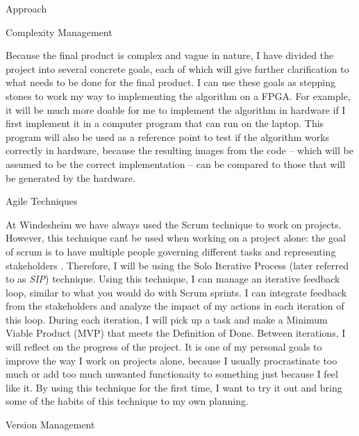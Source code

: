 \documentclass{matthijs}
\begin{document}
	\begin{hoofdstuk}{Approach}

		\begin{paragraaf}{Complexity Management}
			
			Because the final product is complex and vague in nature, I have divided the project into several concrete goals, each of which will give further clarification to what needs to be done for the final product.
			I can use these goals as stepping stones to work my way to implementing the algorithm on a FPGA.
			For example, it will be much more doable for me to implement the algorithm in hardware if I first implement it in a computer program that can run on the laptop.
			This program will also be used as a reference point to test if the algorithm works correctly in hardware, because the resulting images from the code -- which will be assumed to be the correct implementation -- can be compared to those that will be generated by the hardware.
		
		\end{paragraaf}

		\begin{paragraaf}{Agile Techniques}
			
			At Windesheim we have always used the Scrum technique to work on projects.
			However, this technique can\'t be used when working on a project alone: the goal of scrum is to have multiple people governing different tasks and representing stakeholders \cite{gant2019scrum}.
			Therefore, I will be using the Solo Iterative Process \cite{dorman2012sip} (later referred to as \textit{SIP}) technique.
			Using this technique, I can manage an iterative feedback loop, similar to what you would do with Scrum sprints.
			I can integrate feedback from the stakeholders and analyze the impact of my actions in each iteration of this loop.
			During each iteration, I will pick up a task and make a Minimum Viable Product (MVP) that meets the Definition of Done.
			Between iterations, I will reflect on the progress of the project.
			It is one of my personal goals to improve the way I work on projects alone, because I usually procrastinate too much or add too much unwanted functionaity to something just because I feel like it.
			By using this technique for the first time, I want to try it out and bring some of the habits of this technique to my own planning.
		
		\end{paragraaf}

		\begin{paragraaf}{Version Management}


\end{paragraaf}
\end{hoofdstuk}
\end{document}
